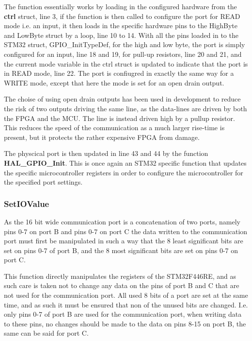 The function essentially works by loading in the configured hardware from the \textbf{ctrl} struct, line 3, if the function is then called to configure the port for READ mode i.e. an input, it then loads in the specific hardware pins to the HighByte and LowByte struct by a loop, line 10 to 14. With all the pins loaded in to the STM32 struct, GPIO\_InitTypeDef, for the high and low byte, the port is simply configured for an input, line 18 and 19, for pull-up resistors, line 20 and 21, and the current mode variable in the ctrl struct is updated to indicate that the port is in READ mode, line 22. The port is confiugred in exactly the same way for a WRITE mode, except that here the mode is set for an open drain output.

The choise of using open drain outputs has been used in development to reduce the risk of two outputs driving the same line, as the data-lines are driven by both the FPGA and the MCU. The line is instead driven high by a pullup resistor. This reduces the speed of the communication as a much larger rise-time is present, but it protects the rather expensive FPGA from damage.

The physcical port is then updated in line 43 and 44 by the function \textbf{HAL\_GPIO\_Init}. This is once again an STM32 specific function that updates the specific microcontroller registers in order to configure the microcontroller for the specified port settings.

\subsubsection*{SetIOValue}
As the 16 bit wide communication port is a concatenation of two ports, namely pins 0-7 on port B and pins 0-7 on port C the data written to the communication port must first be manipulated in such a way that the 8 least significant bits are set on pins 0-7 of port B, and the 8 most significant bits are set on pins 0-7 on port C.

This function directly manipulates the registers of the STM32F446RE, and as such care is taken not to change any data on the pins of port B and C that are not used for the communication port. All used 8 bits of a port are set at the same time, and as such it must be ensured that non of the unused bits are changed. I.e. only pins 0-7 of port B are used for the communication port, when writing data to these pins, no changes should be made to the data on pins 8-15 on port B, the same can be said for port C.

